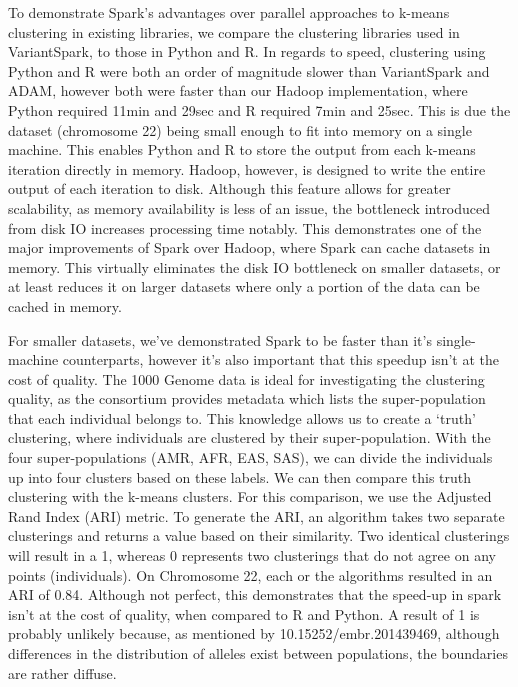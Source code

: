 \documentclass{bmcart}
\newcommand{\variantSpark}{{\sc VariantSpark}}
\begin{document}
To demonstrate {\sc Spark}'s advantages over parallel approaches to k-means clustering in existing libraries, we compare the clustering libraries used in {\variantSpark}, to those in Python and R. 
In regards to speed, clustering using Python and R were both an order of magnitude slower than \variantSpark{} and ADAM, however both were faster than our Hadoop implementation, where Python required 11min and 29sec and R required 7min and 25sec. 
This is due the dataset (chromosome 22) being small enough to fit into memory on a single machine. This enables Python and R to store the output from each k-means iteration directly in memory. Hadoop, however, is designed to write the entire output of each iteration to disk.
Although this feature allows for greater scalability, as memory availability is less of an issue, the bottleneck introduced from disk IO increases processing time notably.
This demonstrates one of the major improvements of {\sc Spark} over Hadoop, where {\sc Spark} can cache datasets in memory. This virtually eliminates the disk IO bottleneck on smaller datasets, or at least reduces it on larger datasets where only a portion of the data can be cached in memory.

For smaller datasets, we've demonstrated {\sc Spark} to be faster than it's single-machine counterparts, however it's also important that this speedup isn't at the cost of quality.
The 1000 Genome data is ideal for investigating the clustering quality, as the consortium provides metadata which lists the super-population that each individual belongs to. This knowledge allows us to create a `truth' clustering, where individuals are clustered by their super-population.
With the four super-populations (AMR, AFR, EAS, SAS), we can divide the individuals up into four clusters based on these labels. We can then compare this truth clustering with the k-means clusters.
For this comparison, we use the Adjusted Rand Index (ARI) metric. To generate the ARI, an algorithm takes two separate clusterings and returns a value based on their similarity.
Two identical clusterings will result in a 1, whereas 0 represents two clusterings that do not agree on any points (individuals). On Chromosome 22, each or the algorithms resulted in an ARI of 0.84. Although not perfect, this demonstrates that the speed-up in spark isn't at the cost of quality, when compared to R and Python.
A result of 1 is probably unlikely because, as mentioned by 10.15252/embr.201439469, although differences in the distribution of alleles exist between populations, the boundaries are rather diffuse. %
\end{document}
